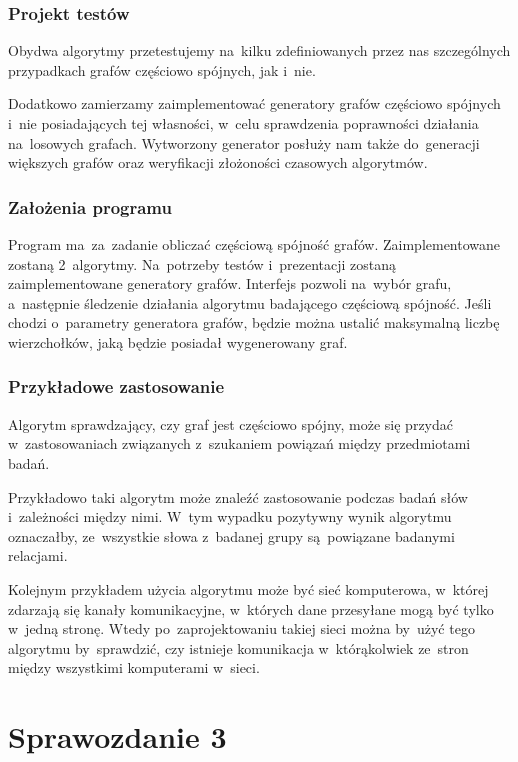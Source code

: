 \documentclass[a4paper,12pt]{mwart}
\begin{document}
\section{Projekt testów}

Obydwa algorytmy przetestujemy na~kilku zdefiniowanych przez nas szczególnych
przypadkach grafów częściowo spójnych, jak i~nie.

Dodatkowo zamierzamy zaimplementować generatory grafów częściowo spójnych i~nie
posiadających tej własności, w~celu sprawdzenia poprawności działania
na~losowych grafach. Wytworzony generator posłuży nam także do~generacji
większych grafów oraz weryfikacji złożoności czasowych algorytmów.

\section{Założenia programu}

Program ma~za~zadanie obliczać częściową spójność grafów. Zaimplementowane
zostaną 2~algorytmy. Na~potrzeby testów i~prezentacji zostaną zaimplementowane
generatory grafów. Interfejs pozwoli na~wybór grafu, a~następnie śledzenie
działania algorytmu badającego częściową spójność. Jeśli chodzi o~parametry
generatora grafów, będzie można ustalić maksymalną liczbę wierzchołków, jaką
będzie posiadał wygenerowany graf.

\section{Przykładowe zastosowanie}

Algorytm sprawdzający, czy graf jest częściowo spójny, może się przydać
w~zastosowaniach związanych z~szukaniem powiązań między przedmiotami badań.

Przykładowo taki algorytm może znaleźć zastosowanie podczas badań słów
i~zależności między nimi. W~tym wypadku pozytywny wynik algorytmu oznaczałby,
ze~wszystkie słowa z~badanej grupy są~powiązane badanymi relacjami.

Kolejnym przykładem użycia algorytmu może być sieć komputerowa, w~której
zdarzają się kanały komunikacyjne, w~których dane przesyłane mogą być tylko
w~jedną stronę. Wtedy po~zaprojektowaniu takiej sieci można by~użyć tego
algorytmu by~sprawdzić, czy istnieje komunikacja w~którąkolwiek ze~stron między
wszystkimi komputerami w~sieci.

\newpage

\part{Sprawozdanie 3}
\end{document}
